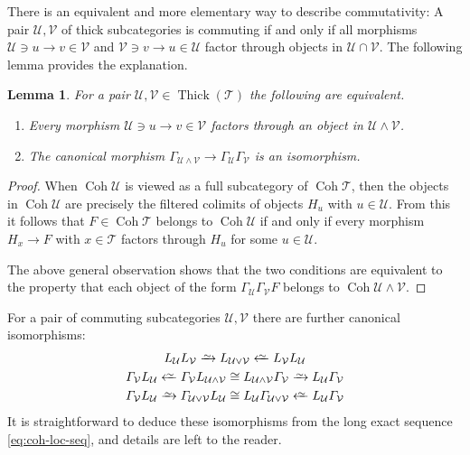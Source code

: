 \documentclass{amsart}[a4]
\newtheorem{lemma}[theorem]{Lemma}
\theoremstyle{definition}
\theoremstyle{remark}
\numberwithin{equation}{section}
\newcommand{\Coh}{\operatorname{Coh}}
\newcommand{\Thick}{\operatorname{Thick}}
\newcommand{\iso}{\xrightarrow{\raisebox{-.6ex}[0ex][0ex]{$\scriptstyle{\sim}$}}}
\newcommand{\leftiso}{\xleftarrow{\raisebox{-.6ex}[0ex][0ex]{$\scriptstyle{\sim}$}}}
\newcommand{\cat}{\mathcal}
\let\Gamma\varGamma
\begin{document}
There is an equivalent and more elementary way to describe
commutativity:  A pair $\cat U,\cat V$ of thick subcategories is
commuting if and only if all morphisms $\cat U\ni u\to v\in\cat V$ and
$\cat V\ni v\to u\in\cat U$ factor through objects in
$\cat U\cap\cat V$. The following lemma provides the explanation.

\begin{lemma}\label{le:U-V-central}
  For a pair $\cat U,\cat V\in\Thick(\cat T)$ the following are equivalent.
\begin{enumerate}
\item Every morphism $\cat U\ni u\to v\in\cat V$ factors through an
  object in $\cat U\wedge\cat V$.
\item The canonical morphism
  $\Gamma_{\cat U\wedge\cat V}\to\Gamma_\cat U\Gamma_\cat V$ is an
  isomorphism.
\end{enumerate}
\end{lemma}
\begin{proof}
  When $\Coh\cat U$ is viewed as a full subcategory of $\Coh\cat T$, then the
  objects in $\Coh\cat U$ are precisely the filtered colimits of objects
  $H_u$ with $u\in\cat U$. From this it follows that $F\in\Coh\cat T$ belongs
  to $\Coh\cat U$ if and only if every morphism $H_x\to F$ with $x\in\cat T$
  factors through $H_u$ for some $u\in\cat U$.

  The above general observation shows that the two conditions are
  equivalent to the property that each object of the form
  $\Gamma_\cat U\Gamma_\cat V F$ belongs to $\Coh\cat U\wedge\cat V$.
\end{proof}

For a pair of commuting subcategories $\cat U,\cat V$ there are further canonical
isomorphisms:
\begin{equation}\label{eq:commuting}
\begin{gathered}
  L_\cat U L_\cat V\iso L_{\cat U\vee\cat V}\leftiso L_\cat V L_\cat U\\
  \Gamma_\cat V L_\cat U\leftiso \Gamma_{\cat V} L_{\cat U\wedge\cat V}\cong L_{\cat U\wedge\cat V} \Gamma_{\cat V}
  \iso L_\cat U\Gamma_\cat V\\
  \Gamma_\cat V L_\cat U\iso \Gamma_{\cat U\vee\cat V} L_\cat U\cong L_\cat U \Gamma_{\cat U\vee\cat V}
  \leftiso L_\cat U\Gamma_\cat V
\end{gathered}
\end{equation}
It is straightforward to deduce these isomorphisms from the long exact sequence
\eqref{eq:coh-loc-seq}, and details are left to the reader.
\end{document}
